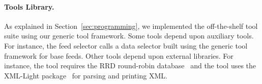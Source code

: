 \paragraph*{Tools Library.}
As explained in Section~\ref{sec:programming}, we implemented the
\padsd{} off-the-shelf tool suite using our generic tool framework. 
Some tools depend upon auxiliary tools.  
For instance, the feed selector calls a data selector built using
the \padsml{} generic tool framework \cite{padsml-padl} for base feeds.
Other tools depend upon external libraries. For instance, the
 tool requires the RRD round-robin database~\cite{rrdtool} and
the  tool uses the XML-Light package~\cite{xmllight} for
parsing and printing XML.

